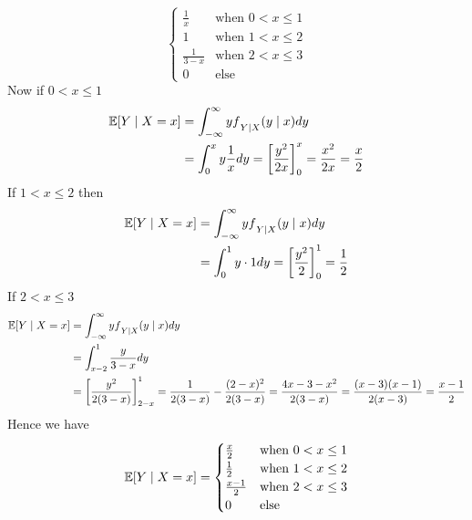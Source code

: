 \documentclass[a4paper, 11pt]{article}
\begin{document}
{\begin{enumerate}[label=(\alph*)]
$$\begin{cases}
	\frac1x & \text{when $0<x\leq 1$}\\
	1 & \text{when $1<x\leq 2$}\\
	\frac{1}{3-x} & \text{when $2<x\leq 3$}\\
	0 &\text{else}
\end{cases}$$Now if $0<x\leq 1$\begin{align*}
\mathbb{E}[Y\mid X=x] & = \int_{-\infty}^{\infty}yf\strut_{Y\mid X}(y\mid x)dy\\
& = \int_0^x y\frac{1}xdy = \left[\frac{y^2}{2x}\right]_0^x=\frac{x^2}{2x}=\frac{x}2
\end{align*}
If $1<x\leq 2$ then \begin{align*}
	\mathbb{E}[Y\mid X=x] & = \int_{-\infty}^{\infty}yf\strut_{Y\mid X}(y\mid x)dy\\
	& =  \int_0^1 y\cdot 1dy =\left[\frac{y^2}2\right]^1_0=\frac1{2}
\end{align*} If $2<x\leq 3$ \begin{align*}
\mathbb{E}[Y\mid X=x] & = \int_{-\infty}^{\infty}yf\strut_{Y\mid X}(y\mid x)dy\\
& = \int_{x-2}^1\frac{y}{3-x}dy\\
& = \left[\frac{y^2}{2(3-x)}\right]^1_{2-x}=\frac1{2(3-x)}-\frac{(2-x)^2}{2(3-x)}=\frac{4x-3-x^2}{2(3-x)}=\frac{(x-3)(x-1)}{2(x-3)}=\frac{x-1}{2}
\end{align*}Hence we have $$\mathbb{E}[Y\mid X=x]=\begin{cases}
\frac{x}2 & \text{when $0<x\leq 1$}\\ \frac12 & \text{when $1<x\leq 2$}\\ \frac{x-1}{2} & \text{when $2<x\leq 3$}\\ 0 & \text{else}
\end{cases}$$
\end{enumerate}
}


\end{document}
